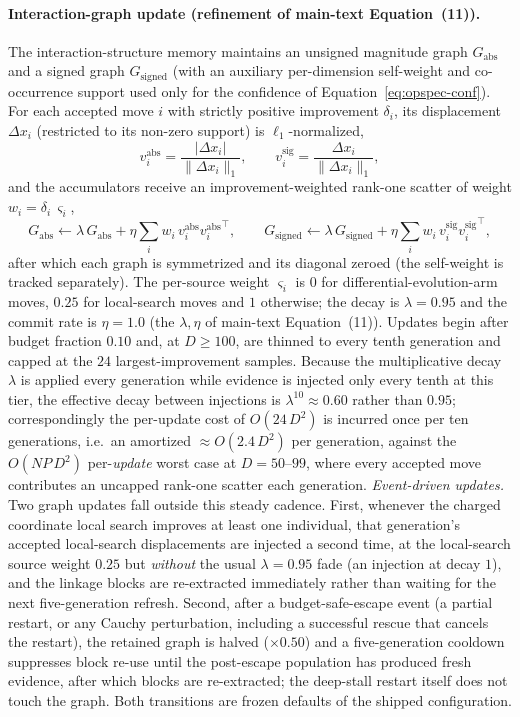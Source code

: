 \documentclass[algorithms,article,submit,moreauthors,pdftex]{Definitions/mdpi}
\begin{document}
\paragraph{Interaction-graph update (refinement of main-text Equation~(11)).}
The interaction-structure memory maintains an unsigned magnitude graph
$G_{\mathrm{abs}}$ and a signed graph $G_{\mathrm{signed}}$ (with an auxiliary
per-dimension self-weight and co-occurrence support used only for the confidence
of Equation~\eqref{eq:opspec-conf}).  For each accepted move $i$ with strictly
positive improvement $\delta_i$, its displacement $\Delta x_i$ (restricted to
its non-zero support) is $\ell_1$-normalized,
\begin{equation}
v^{\mathrm{abs}}_i = \frac{\lvert \Delta x_i\rvert}{\lVert \Delta x_i\rVert_1},
\qquad
v^{\mathrm{sig}}_i = \frac{\Delta x_i}{\lVert \Delta x_i\rVert_1},
\end{equation}
and the accumulators receive an improvement-weighted rank-one scatter of weight
$w_i=\delta_i\,\varsigma_i$,
\begin{equation}
G_{\mathrm{abs}} \leftarrow \lambda\,G_{\mathrm{abs}}
 + \eta\sum_i w_i\, v^{\mathrm{abs}}_i {v^{\mathrm{abs}}_i}^{\!\top},
\qquad
G_{\mathrm{signed}} \leftarrow \lambda\,G_{\mathrm{signed}}
 + \eta\sum_i w_i\, v^{\mathrm{sig}}_i {v^{\mathrm{sig}}_i}^{\!\top},
\end{equation}
after which each graph is symmetrized and its diagonal zeroed (the self-weight
is tracked separately).  The per-source weight $\varsigma_i$ is $0$ for
differential-evolution-arm moves, $0.25$ for local-search moves and $1$
otherwise; the decay is $\lambda=0.95$ and the commit rate is $\eta=1.0$ (the
$\lambda,\eta$ of main-text Equation~(11)).  Updates begin after budget fraction $0.10$
and, at $D\ge 100$, are thinned to every tenth generation and capped at the $24$
largest-improvement samples.  Because the multiplicative decay $\lambda$ is applied
every generation while evidence is injected only every tenth at this tier, the
effective decay between injections is $\lambda^{10}\approx 0.60$ rather than $0.95$;
correspondingly the per-update cost of $O(24\,D^2)$ is incurred once per ten
generations, i.e.\ an amortized $\approx O(2.4\,D^2)$ per generation, against the
$O(NP\,D^2)$ per-\emph{update} worst case at $D=50$--$99$, where every accepted move
contributes an uncapped rank-one scatter each generation.
\emph{Event-driven updates.} Two graph updates fall outside this steady cadence. First, whenever the charged coordinate local search improves at least one individual, that generation's accepted local-search displacements are injected a second time, at the local-search source weight $0.25$ but \emph{without} the usual $\lambda=0.95$ fade (an injection at decay $1$), and the linkage blocks are re-extracted immediately rather than waiting for the next five-generation refresh. Second, after a budget-safe-escape event (a partial restart, or any Cauchy perturbation, including a successful rescue that cancels the restart), the retained graph is halved ($\times 0.50$) and a five-generation cooldown suppresses block re-use until the post-escape population has produced fresh evidence, after which blocks are re-extracted; the deep-stall restart itself does not touch the graph. Both transitions are frozen defaults of the shipped configuration.
\end{document}
